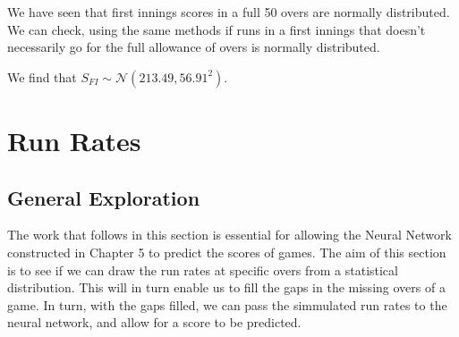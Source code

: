 We have seen that first innings scores in a full 50 overs are normally distributed. We can check, using the same methods if runs in a first innings that 
doesn't necessarily go for the full allowance of overs is normally distributed. 

We find that $S_{FI} \sim \mathcal{N}(213.49,56.91^2)$. 

\section{Run Rates}
\label{exprr}

\subsection{General Exploration}
The work that follows in this section is essential for allowing the Neural Network constructed in Chapter 5 to predict the scores of games. The aim of this section is 
to see if we can draw the run rates at specific overs from a statistical distribution. This will in turn enable us to fill the gaps in the missing overs of a game. In turn, 
with the gaps filled, we can pass the simmulated run rates to the neural network, and allow for a score to be predicted. \\

